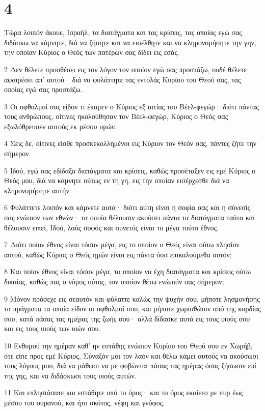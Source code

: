 \chapter{4}

\par Τώρα λοιπόν άκουε, Ισραήλ, τα διατάγματα και τας κρίσεις, τας οποίας εγώ σας διδάσκω να κάμνητε, διά να ζήσητε και να εισέλθητε και να κληρονομήσητε την γην, την οποίαν Κύριος ο Θεός των πατέρων σας δίδει εις εσάς.
\par 2 Δεν θέλετε προσθέσει εις τον λόγον τον οποίον εγώ σας προστάζω, ουδέ θέλετε αφαιρέσει απ' αυτού· διά να φυλάττητε τας εντολάς Κυρίου του Θεού σας, τας οποίας εγώ σας προστάζω.
\par 3 Οι οφθαλμοί σας είδον τι έκαμεν ο Κύριος εξ αιτίας του Βέελ-φεγώρ· διότι πάντας τους ανθρώπους, οίτινες ηκολούθησαν τον Βέελ-φεγώρ, Κύριος ο Θεός σας εξωλόθρευσεν αυτούς εκ μέσου υμών.
\par 4 Σεις δε, οίτινες είσθε προσκεκολλημένοι εις Κύριον τον Θεόν σας, πάντες ζήτε την σήμερον.
\par 5 Ιδού, εγώ σας εδίδαξα διατάγματα και κρίσεις, καθώς προσέταξεν εις εμέ Κύριος ο Θεός μου, διά να κάμνητε ούτως εν τη γη, εις την οποίαν εισέρχεσθε διά να κληρονομήσητε αυτήν.
\par 6 Φυλάττετε λοιπόν και κάμνετε αυτά· διότι αύτη είναι η σοφία σας και η σύνεσίς σας ενώπιον των εθνών· τα οποία θέλουσιν ακούσει πάντα τα διατάγματα ταύτα και θέλουσιν ειπεί, Ιδού, λαός σοφός και συνετός είναι το μέγα τούτο έθνος.
\par 7 Διότι ποίον έθνος είναι τόσον μέγα, εις το οποίον ο Θεός είναι ούτω πλησίον αυτού, καθώς Κύριος ο Θεός ημών είναι εις πάντα όσα επικαλούμεθα αυτόν;
\par 8 Και ποίον έθνος είναι τόσον μέγα, το οποίον να έχη διατάγματα και κρίσεις ούτω δικαίας, καθώς πας ο νόμος ούτος, τον οποίον θέτω ενώπιόν σας σήμερον;
\par 9 Μόνον πρόσεχε εις σεαυτόν και φύλαττε καλώς την ψυχήν σου, μήποτε λησμονήσης τα πράγματα τα οποία είδον οι οφθαλμοί σου, και μήποτε χωρισθώσιν από της καρδίας σου, κατά πάσας τας ημέρας της ζωής σου· αλλά δίδασκε αυτά εις τους υιούς σου και εις τους υιούς των υιών σου.
\par 10 Ενθυμού την ημέραν καθ' ην εστάθης ενώπιον Κυρίου του Θεού σου εν Χωρήβ, ότε είπε προς εμέ Κύριος, Σύναξόν μοι τον λαόν και θέλω κάμει αυτούς να ακούσωσι τους λόγους μου, διά να μάθωσι να με φοβώνται πάσας τας ημέρας όσας ζήσωσιν επί της γης, και να διδάσκωσι τους υιούς αυτών.
\par 11 Και επλησιάσατε και εστάθητε υπό το όρος· και το όρος εκαίετο με πυρ έως μέσου του ουρανού, και ήτο σκότος, νέφη και γνόφος.
